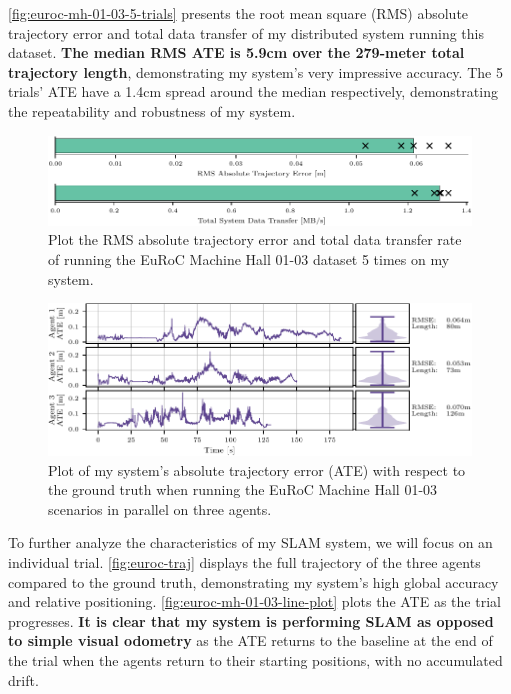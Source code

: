 \autoref{fig:euroc-mh-01-03-5-trials} presents the root mean square (RMS) absolute trajectory error and total data transfer of my distributed system running this dataset. \textbf{The median RMS ATE is 5.9cm over the 279-meter total trajectory length}, demonstrating my system's very impressive accuracy. The 5 trials' ATE have a 1.4cm spread around the median respectively, demonstrating the repeatability and robustness of my system.

\begin{figure}[h]
    \centering
    \includegraphics[width=0.8\linewidth]{figures/comparison_apr11_mh_trajectory_b.pdf}

    \caption{Plot the RMS absolute trajectory error and total data transfer rate of running the EuRoC Machine Hall 01-03 dataset 5 times on my system.}
    \label{fig:euroc-mh-01-03-5-trials}
\end{figure}

\begin{figure}[h]
    \centering
    \includegraphics[width=0.85\linewidth]{figures/apr11_mh_trajectory_b_line_plot.pdf}

    \caption{Plot of my system's absolute trajectory error (ATE) with respect to the ground truth when running the EuRoC Machine Hall 01-03 scenarios in parallel on three agents.}
    \label{fig:euroc-mh-01-03-line-plot}
\end{figure}

To further analyze the characteristics of my SLAM system, we will focus on an individual trial. \autoref{fig:euroc-traj} displays the full trajectory of the three agents compared to the ground truth, demonstrating my system's high global accuracy and relative positioning. \autoref{fig:euroc-mh-01-03-line-plot} plots the ATE as the trial progresses. \textbf{It is clear that my system is performing SLAM as opposed to simple visual odometry} as the ATE returns to the baseline at the end of the trial when the agents return to their starting positions, with no accumulated drift.


